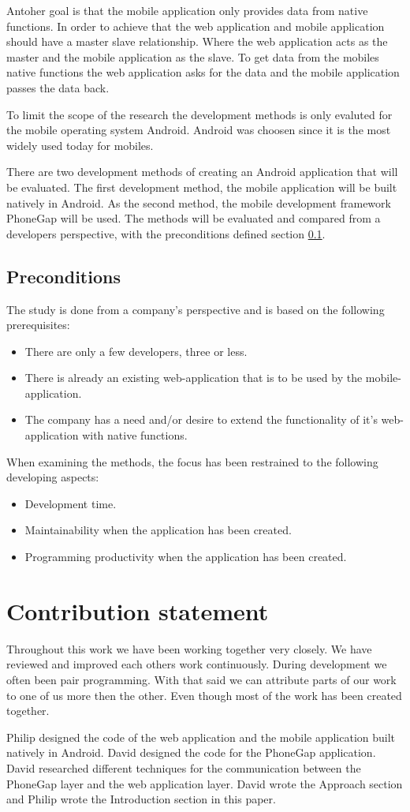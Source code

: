 Antoher goal is that the mobile application only provides data from native functions. In order to achieve that the web application and mobile application should have a master slave relationship. Where the web application acts as the master and the mobile application as the slave. To get data from the mobiles native functions the web application asks for the data and the mobile application passes the data back. 

To limit the scope of the research the development methods is only evaluted for the mobile operating system Android. Android was choosen since it is the most widely used today for mobiles. 

There are two development methods of creating an Android application that will be evaluated. The first development method, the mobile application will be built natively in Android. As the second method, the mobile development framework PhoneGap will be used. The methods will be evaluated and compared from a developers perspective, with the preconditions defined section \ref{section-preconditions}.

\subsection{Preconditions} \label{section-preconditions}
The study is done from a company's perspective and is based on the following prerequisites:
\begin{itemize}
\item There are only a few developers, three or less.
\item There is already an existing web-application that is to be used by the mobile-application.
\item The company has a need and/or desire to extend the functionality of it's web-application with native functions.
\end{itemize}

When examining the methods, the focus has been restrained to the following developing aspects:
\begin{itemize}
\item Development time.
\item Maintainability when the application has been created. 
\item Programming productivity when the application has been created.
\end{itemize}
\section{Contribution statement}
Throughout this work we have been working together very closely. We have reviewed and improved each others work continuously. During development we often been pair programming. With that said we can attribute parts of our work to one of us more then the other. Even though most of the work has been created together. 

Philip designed the code of the web application and the mobile application built natively in Android. David designed the code for the PhoneGap application. David researched different techniques for the communication between the PhoneGap layer and the web application layer. David wrote the Approach section and Philip wrote the Introduction section in this paper. 
